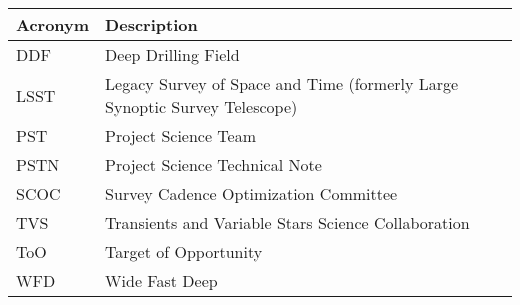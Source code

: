 \addtocounter{table}{-1}
\begin{longtable}{p{}p{}}\hline
\textbf{Acronym} & \textbf{Description}  \\\hline

DDF & Deep Drilling Field \\\hline
LSST & Legacy Survey of Space and Time (formerly Large Synoptic Survey Telescope) \\\hline
PST & Project Science Team \\\hline
PSTN & Project Science Technical Note \\\hline
SCOC & Survey Cadence Optimization Committee \\\hline
TVS & Transients and Variable Stars Science Collaboration \\\hline
ToO & Target of Opportunity \\\hline
WFD & Wide Fast Deep \\\hline
\end{longtable}
